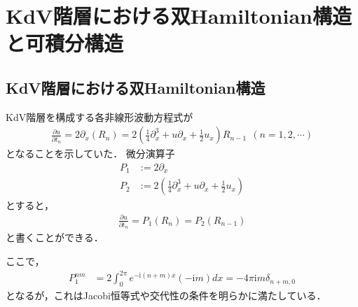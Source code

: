 \documentclass[dvipdfmx,12pt,a4paper,uplatex]{jsarticle}
\theoremstyle{plain}
\theoremstyle{definition}
\begin{document}
\section{KdV階層における双Hamiltonian構造と可積分構造}
\subsection{KdV階層における双Hamiltonian構造}
KdV階層を構成する各非線形波動方程式が
\begin{align}
\frac{\partial u}{\partial t_n} 
= 2\partial_x(R_n)
= 2\left(\frac14 \partial_x^3 + u\partial_x + \frac12 u_x \right)
R_{n-1}  \ \ (n=1,2,\cdots)
\end{align}
となることを示していた．
微分演算子
\begin{align}
P_1 &:= 2\partial_x \\
P_2 &:= 2\left(\frac14 \partial_x^3 + u\partial_x + \frac12 u_x \right)
\end{align}
とすると，
\begin{align}
\frac{\partial u}{\partial t_n} 
= P_1 (R_n)
= P_2 (R_{n-1})
\end{align}
と書くことができる．

ここで，
\begin{align}
P_1^{nm}
&=
2\int_0^{2\pi}
e^{-\mathrm i (n+m)x}(-\mathrm i m) dx
=
-4\pi\mathrm{i}m\delta_{n+m,0} 
\end{align}
となるが，これはJacobi恒等式や交代性の条件を明らかに満たしている．
\end{document}

